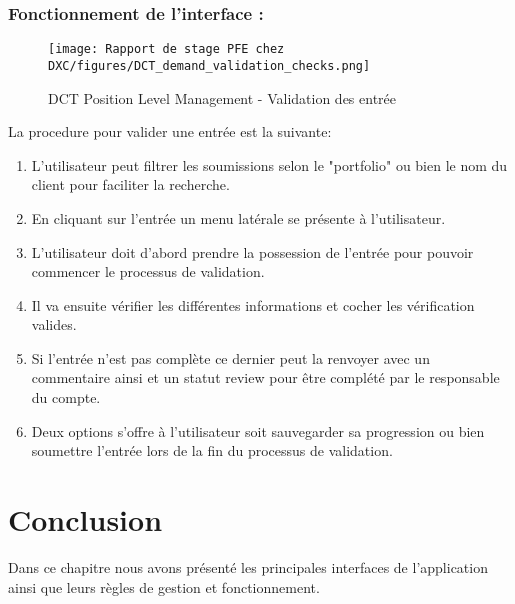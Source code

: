 \subsubsection{Fonctionnement de l'interface :}

\begin{figure}[H]
    \centering
    \texttt{[image: Rapport de stage PFE chez DXC/figures/DCT\_demand\_validation\_checks.png]}
    \caption{DCT Position Level Management - Validation des entrée}
\end{figure}

La procedure pour valider une entrée est la suivante:

\begin{enumerate}
    
    \item L'utilisateur peut filtrer les soumissions selon le "portfolio" ou bien le nom du client pour faciliter la recherche.
    \vspace{0.1cm}
    \item En cliquant sur l'entrée un menu latérale se présente à l'utilisateur.
    \vspace{0.1cm}
    \item L'utilisateur doit d'abord prendre la possession de l'entrée pour pouvoir commencer le processus de validation.
    \vspace{0.1cm}
    \item Il va ensuite vérifier les différentes informations et cocher les vérification valides.
    \vspace{0.1cm}
    \item Si l'entrée n'est pas complète ce dernier peut la renvoyer avec un commentaire ainsi et un statut review pour être complété par le responsable du compte.
    \vspace{0.1cm}
    \item Deux options s'offre à l'utilisateur soit sauvegarder sa progression ou bien soumettre l'entrée lors de la fin du processus de validation.

\end{enumerate}

\section{Conclusion}
Dans ce chapitre nous avons présenté les principales interfaces de l'application ainsi que leurs règles de gestion et fonctionnement.
